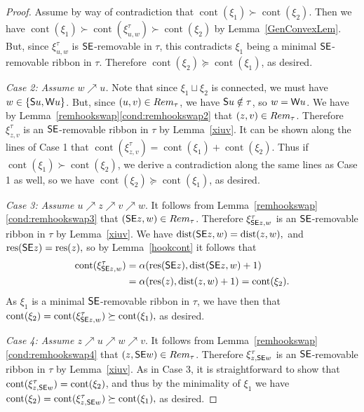\documentclass[Unicode,ALCO]{cedram}
\newcommand{\res}{\operatorname{res}}
\newcommand{\0}{{\bar 0}}
\newcommand{\dist}{{\mathrm {dist}}}
\newcommand{\so}{{\sf S}}
\newcommand{\we}{{\sf W}}
\newcommand{\ssee}{{\sf SE}}
\def\cont{{\operatorname{cont}}}
\begin{document}
\begin{proof}
Assume by way of contradiction that \(\cont(\xi_1) \succ \cont(\xi_2)\). Then we have \(\cont(\xi_1) \succ \cont(\xi^\tau_{u,w}) \succ \cont(\xi_2)\) by Lemma~\ref{GenConvexLem}. But, since \(\xi^\tau_{u,w}\) is \(\ssee\)-removable in \(\tau\), this contradicts \(\xi_1\) being a minimal \(\ssee\)-removable ribbon in \(\tau\). Therefore \(\cont(\xi_2) \succeq \cont(\xi_1)\), as desired.

 {\em Case 2: Assume \(w \nearrow u\).} Note that since \(\xi_1 \sqcup \xi_2\) is connected, we must have \(w \in \{\so u, \we u\}\). But, since \((u,v) \in \textup{Rem}_\tau\),
we have \(\so u \notin \tau\), so \(w=\we u\). We have by Lemma~\ref{remhookswap}\eqref{cond:remhookswap2} that \((z,v) \in \textup{Rem}_\tau\). Therefore \(\xi^\tau_{z,v}\) is an \(\ssee\)-removable ribbon in \(\tau\) by Lemma~\ref{xiuv}. 
 It can be shown along the lines of Case 1 that \(\cont(\xi^\tau_{z,v}) = \cont(\xi_1) + \cont(\xi_2)\). Thus if \(\cont(\xi_1) \succ \cont(\xi_2)\), we derive a contradiction along the same lines as Case 1 as well, so we have \(\cont(\xi_2) \succeq \cont(\xi_1)\), as desired.
 
 {\em Case 3: Assume \(u \nearrow z \nearrow v \nearrow w\)}. It follows from Lemma~\ref{remhookswap}\eqref{cond:remhookswap3} that \((\ssee z, w) \in \textup{Rem}_\tau\). 
Therefore \(\xi^\tau_{\ssee z,w}\) is an \(\ssee\)-removable ribbon in \(\tau\) by Lemma~\ref{xiuv}.
 We have
\(
 \dist(\ssee z ,w) = \dist(z,w),
\)
 and
\(
 \res(\ssee z) =\res(z),
\)
 so by Lemma~\ref{hookcont} it follows that 
 \begin{align*}
 \cont(\xi^\tau_{\ssee z,w}) &= \alpha(\res(\ssee z), \dist(\ssee z,w)+1)\\
 &= \alpha(\res(z),\dist(z,w)+1) = \cont(\xi_2).
 \end{align*}
As \(\xi_1\) is a minimal \(\ssee\)-removable ribbon in \(\tau\), we have then that
\(
\cont(\xi_2) = \cont(\xi^\tau_{\ssee z,w}) \succeq \cont(\xi_1),
\)
as desired.

{\em Case 4: Assume \(z \nearrow u \nearrow w \nearrow v\)}. 
It follows from Lemma~\ref{remhookswap}\eqref{cond:remhookswap4} that \((z, \ssee w) \in \textup{Rem}_\tau\).
Therefore \(\xi^\tau_{z, \ssee w}\) is an \(\ssee\)-removable ribbon in \(\tau\) by Lemma~\ref{xiuv}.
As in Case 3, it is straightforward to show that \(\cont(\xi^\tau_{z, \ssee w}) = \cont(\xi_2)\), and thus by the minimality of \(\xi_1\) we have
\(
\cont(\xi_2) = \cont(\xi^\tau_{z, \ssee w}) \succeq \cont(\xi_1),
\)
as desired.


\end{proof}
\end{document}
